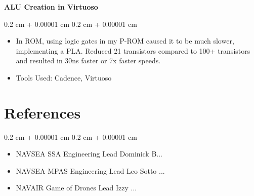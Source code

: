 \documentclass[10pt, letterpaper]{article}
\newenvironment{highlights}{
    \begin{itemize}[
        topsep=0.10 cm,
        parsep=0.10 cm,
        partopsep=0pt,
        itemsep=0pt,
        leftmargin=0.4 cm + 10pt
    ]
}{
    \end{itemize}
} %
\newenvironment{onecolentry}{
    \begin{adjustwidth}{
        0.2 cm + 0.00001 cm
    }{
        0.2 cm + 0.00001 cm
    }
}{
    \end{adjustwidth}
} %
\begin{document}
        \vspace{0.2 cm}

        \textbf{ALU Creation in Virtuoso}

        \vspace{0.10 cm}
        \begin{onecolentry}
            \begin{highlights}
                \item In ROM, using logic gates in my P-ROM caused it to be much slower, implementing a PLA. Reduced 21 transistors compared to 100+ transistors and resulted in 30ns faster or 7x faster speeds.
                \item Tools Used: Cadence, Virtuoso
            \end{highlights}
        \end{onecolentry}


        \vspace{0.2 cm}

    \section{References}
        
        \begin{onecolentry}
            \begin{highlights}
                \item NAVSEA SSA Engineering Lead Dominick B... 
                \item NAVSEA MPAS Engineering Lead Leo Sotto ...
                \item NAVAIR Game of Drones Lead Izzy ...
            \end{highlights}
        \end{onecolentry}
        \vspace{0.2 cm}
\end{document}
